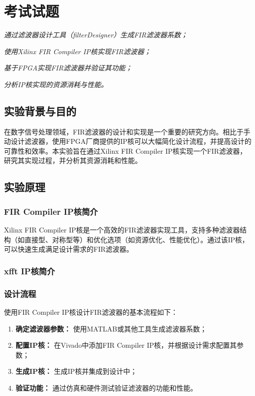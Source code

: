 \chapter{考试试题}
\begin{introduction}
    \item \textit{通过滤波器设计工具（filterDesigner）生成FIR滤波器系数；}
    \item \textit{使用Xilinx FIR Compiler IP核实现FIR滤波器；}
    \item \textit{基于FPGA实现FIR滤波器并验证其功能；}
    \item \textit{分析IP核实现的资源消耗与性能。}
\end{introduction}

\section{实验背景与目的}
在数字信号处理领域，FIR滤波器的设计和实现是一个重要的研究方向。相比于手动设计滤波器，使用FPGA厂商提供的IP核可以大幅简化设计流程，并提高设计的可靠性和效率。本实验旨在通过Xilinx FIR Compiler IP核实现一个FIR滤波器，研究其实现过程，并分析其资源消耗和性能。

\section{实验原理}
\subsection{FIR Compiler IP核简介}
Xilinx FIR Compiler IP核是一个高效的FIR滤波器实现工具，支持多种滤波器结构（如直接型、对称型等）和优化选项（如资源优化、性能优化）。通过该IP核，可以快速生成满足设计需求的FIR滤波器。

\subsection{xfft IP核简介}

\subsection{设计流程}
使用FIR Compiler IP核设计FIR滤波器的基本流程如下：
\begin{enumerate}
    \item \textbf{确定滤波器参数：} 使用MATLAB或其他工具生成滤波器系数；
    \item \textbf{配置IP核：} 在Vivado中添加FIR Compiler IP核，并根据设计需求配置其参数；
    \item \textbf{生成IP核：} 生成IP核并集成到设计中；
    \item \textbf{验证功能：} 通过仿真和硬件测试验证滤波器的功能和性能。
\end{enumerate}
